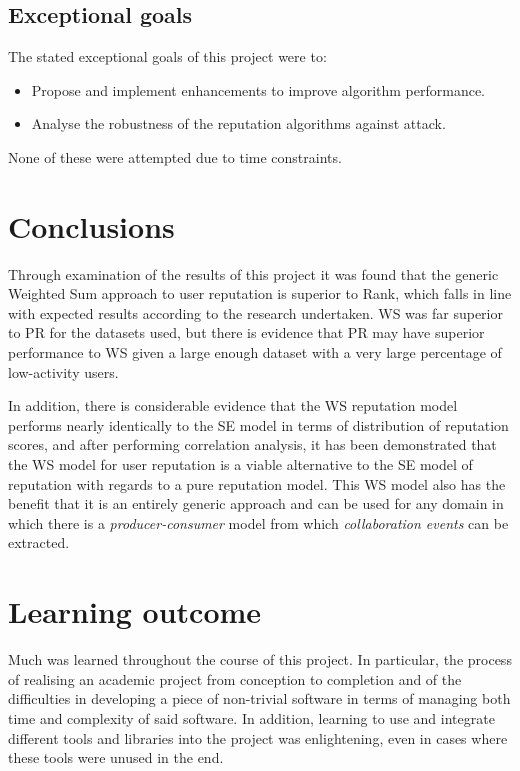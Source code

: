 \documentclass[]{final_report}
\begin{document}
\subsection{Exceptional goals}

The stated exceptional goals of this project were to:
\begin{itemize}
\item Propose and implement enhancements to improve algorithm performance.
\item Analyse the robustness of the reputation algorithms against attack.
\end{itemize}
None of these were attempted due to time constraints.

\section{Conclusions}

Through examination of the results of this project it was found that the generic Weighted Sum approach to user reputation is superior to Rank, which falls in line with expected results according to the research undertaken. WS was far superior to PR for the datasets used, but there is evidence that PR may have superior performance to WS given a large enough dataset with a very large percentage of low-activity users. 

In addition, there is considerable evidence that the WS reputation model performs nearly identically to the SE model in terms of distribution of reputation scores, and after performing correlation analysis, it has been demonstrated that the WS model for user reputation is a viable alternative to the SE model of reputation with regards to a pure reputation model. This WS model also has the benefit that it is an entirely generic approach and can be used for any domain in which there is a \textsl{producer-consumer} model from which \textsl{collaboration events} can be extracted.

\section{Learning outcome}

Much was learned throughout the course of this project. In particular, the process of realising an academic project from conception to completion and of the difficulties in developing a piece of non-trivial software in terms of managing both time and complexity of said software. In addition, learning to use and integrate different tools and libraries into the project was enlightening, even in cases where these tools were unused in the end.
\end{document}

